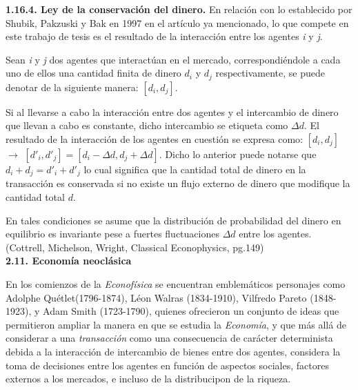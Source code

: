 {
\noindent
\Large  \textbf{1.16.4. Ley de la conservación del dinero.} 
}
\newline
En relación con lo establecido por Shubik, Pakzuski y Bak en 1997 en el artículo ya mencionado, lo que compete en este trabajo de tesis es el resultado de la interacción entre los agentes \textit{i} y \textit{j}. 

Sean \textit{i} y \textit{j} dos agentes que interactúan en el mercado, correspondiéndole a cada uno de ellos una cantidad finita de dinero $d_{i}$ y $d_{j}$ respectivamente, se puede denotar de la siguiente manera: $[d_{i},d_{j}]$. 

Si al llevarse a cabo la interacción entre dos agentes y el intercambio de dinero que llevan a cabo es constante, dicho intercambio se etiqueta como $\Delta d$. El resultado de la interacción de los agentes en cuestión se expresa como:  $[d_{i},d_{j}]$ $\longrightarrow$  $[d'_{i},d'_{j}] = [d_{i} - \Delta d ,d_{j} + \Delta d]$. Dicho lo anterior puede notarse que $d_{i} + d_{j} = d'_{i} + d'_{j}$ lo cual significa que la cantidad total de dinero en la transacción es conservada si no existe un flujo externo de dinero que modifique la cantidad total $d$.

En tales condiciones se asume que la distribución de probabilidad del dinero en equilibrio es invariante pese a fuertes fluctuaciones $\Delta d$ entre los agentes. (Cottrell, Michelson, Wright, Classical Econophysics, pg.149)
\newline
\\


{
\noindent
\Large  \textbf{2.11. Economía neoclásica} 
}

En los comienzos de la \textit{Econofísica} se encuentran emblemáticos personajes como Adolphe Quétlet(1796-1874), Léon Walras (1834-1910), Vilfredo Pareto (1848-1923), y Adam Smith (1723-1790), quienes ofrecieron un conjunto de ideas que permitieron ampliar la manera en que se estudia la \textit{Economía}, y que más allá de considerar a una \textit{transacción} como una consecuencia de carácter determinista debida a la interacción de intercambio de bienes entre dos agentes, considera la toma de decisiones entre los agentes en función de aspectos sociales, factores externos a los mercados, e incluso de la distribucipon de la riqueza.
\newline

